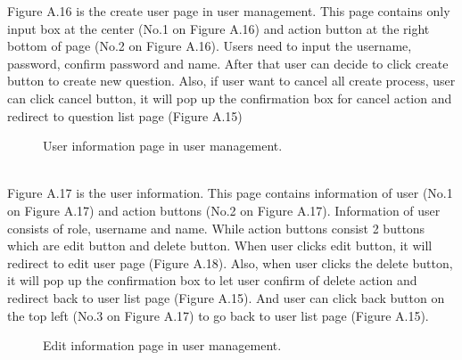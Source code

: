 \documentclass[12pt,oneside,openright,a4paper]{cpe-english-project}
\begin{document}
Figure A.16 is the create user page in user management. This page contains only 
input box at the center (No.1 on Figure A.16) and action button at the right bottom of page 
(No.2 on Figure A.16).
Users need to input the username, password, confirm password and name. After that 
user can decide to click create button to create new question. Also, if user want to cancel all 
create process, user can click cancel button, it will pop up the confirmation box for cancel 
action and redirect to question list page (Figure A.15) \\
\begin{figure}[!h]\centering
{}
\caption{User information page in user management.
}\label{fig:User information page in user management.
}
\end{figure} \\

Figure A.17 is the user information. This page contains information of user (No.1 on 
Figure A.17) and action buttons (No.2 on Figure A.17).
Information of user consists of role, username and name. While action buttons 
consist 2 buttons which are edit button and delete button. When user clicks edit button, it 
will redirect to edit user page (Figure A.18). Also, when user clicks the delete button, it will 
pop up the confirmation box to let user confirm of delete action and redirect back to user list 
page (Figure A.15). And user can click back button on the top left (No.3 on Figure A.17) to 
go back to user list page (Figure A.15). \\
\begin{figure}[!h]\centering
{}
\caption{Edit information page in user management.
}\label{fig:Edit information page in user management.
}
\end{figure} \\
\end{document}
